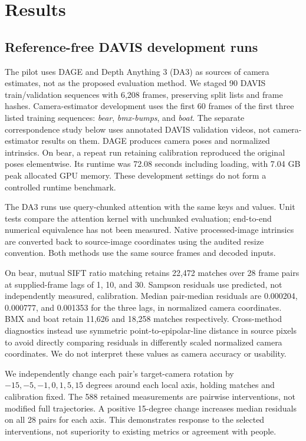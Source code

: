 \documentclass[10pt,twocolumn]{article}
\begin{document}
\section{Results}

\subsection{Reference-free DAVIS development runs}
The pilot uses DAGE \cite{dage2026} and Depth Anything 3 (DA3) \cite{yang2025depthanything3} as sources of camera estimates, not as the proposed evaluation method.
We staged 90 DAVIS train/validation sequences with 6,208 frames, preserving split lists and frame hashes. Camera-estimator development uses the first 60 frames of the first three listed training sequences: \emph{bear}, \emph{bmx-bumps}, and \emph{boat}. The separate correspondence study below uses annotated DAVIS validation videos, not camera-estimator results on them. DAGE produces camera poses and normalized intrinsics. On bear, a repeat run retaining calibration reproduced the original poses elementwise. Its runtime was 72.08 seconds including loading, with 7.04 GB peak allocated GPU memory. These development settings do not form a controlled runtime benchmark.

The DA3 runs use query-chunked attention with the same keys and values. Unit tests compare the attention kernel with unchunked evaluation; end-to-end numerical equivalence has not been measured. Native processed-image intrinsics are converted back to source-image coordinates using the audited resize convention. Both methods use the same source frames and decoded inputs.

On bear, mutual SIFT ratio matching retains 22,472 matches over 28 frame pairs at supplied-frame lags of 1, 10, and 30. Sampson residuals use predicted, not independently measured, calibration. Median pair-median residuals are 0.000204, 0.000777, and 0.001353 for the three lags, in normalized camera coordinates. BMX and boat retain 11,626 and 18,258 matches respectively. Cross-method diagnostics instead use symmetric point-to-epipolar-line distance in source pixels to avoid directly comparing residuals in differently scaled normalized camera coordinates. We do not interpret these values as camera accuracy or usability.

We independently change each pair's target-camera rotation by $-15,-5,-1,0,1,5,15$ degrees around each local axis, holding matches and calibration fixed. The 588 retained measurements are pairwise interventions, not modified full trajectories. A positive 15-degree change increases median residuals on all 28 pairs for each axis. This demonstrates response to the selected interventions, not superiority to existing metrics or agreement with people.
\end{document}
